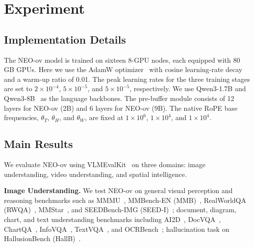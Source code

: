 \documentclass[11pt]{article}
\begin{document}
\section{Experiment}

\subsection{Implementation Details}

The NEO-ov model is trained on sixteen 8-GPU nodes, each equipped with 80 GB GPUs. Here we use the AdamW optimizer~\citep{Training:AdamW} with cosine learning-rate decay and a warm-up ratio of 0.01. The peak learning rates for the three training stages are set to $2 \times 10^{-4}$, $5 \times 10^{-5}$, and $5 \times 10^{-5}$, respectively.
%
We use Qwen3-1.7B and Qwen3-8B~\citep{TransF:Qwen3} as the language backbones. The pre-buffer module consists of 12 layers for NEO-ov (2B) and 6 layers for NEO-ov (9B). The native RoPE base frequencies, $\theta_T$, $\theta_H$, and $\theta_W$, are fixed at $1 \times 10^{6}$, $1 \times 10^{4}$, and $1 \times 10^{4}$.



\subsection{Main Results}

We evaluate NEO-ov using VLMEvalKit~\cite{VLM:VLMEvalKit} on three domains: image understanding, video understanding, and spatial intelligence.

\textbf{Image Understanding.}
We test NEO-ov on general visual perception and reasoning benchmarks such as MMMU~\cite{Datasets:MMMU}, MMBench-EN (MMB)~\cite{Datasets:MMBench}, RealWorldQA (RWQA)~\cite{Datasets:Realworldqa}, MMStar~\cite{Datasets:MMStar}, and SEEDBench-IMG (SEED-I)~\cite{Datasets:Seed-bench}; document, diagram, chart, and text understanding benchmarks including AI2D~\cite{Datasets:AI2D}, DocVQA~\cite{Datasets:DocVQA}, ChartQA~\cite{Datasets:ChartQA}, InfoVQA~\cite{Datasets:InfoVQA}, TextVQA~\cite{Datasets:TextVQA}, and OCRBench~\cite{Datasets:OCRBench}; hallucination task on HallusionBench (HallB)~\cite{Datasets:Hallusionbench}.
\end{document}
